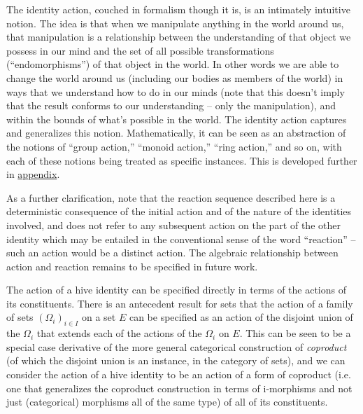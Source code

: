 \documentclass[pra,twocolumn,groupedaddress,10pt]{revtex4}
\theoremstyle{definition}
\begin{document}
The identity action, couched in formalism though it is, is an intimately intuitive notion. The idea is that when we manipulate anything in the world around us, that manipulation is a relationship between the understanding of that object we possess in our mind and the set of all possible transformations (``endomorphisms'') of that object in the world. In other words we are able to change the world around us (including our bodies as members of the world) in ways that we understand how to do in our minds (note that this doesn't imply that the result conforms to our understanding -- only the manipulation), and within the bounds of what's possible in the world. The identity action captures and generalizes this notion. Mathematically, it can be seen as an abstraction of the notions of ``group action,'' ``monoid action,'' ``ring action,'' and so on, with each of these notions being treated as specific instances. This is developed further in \hyperref[app:algact]{appendix}.

As a further clarification, note that the reaction sequence described here is a deterministic consequence of the initial action and of the nature of the identities involved, and does not refer to any subsequent action on the part of the other identity which may be entailed in the conventional sense of the word ``reaction'' -- such an action would be a distinct action. The algebraic relationship between action and reaction remains to be specified in future work.

The action of a hive identity can be specified directly in terms of the actions of its constituents. There is an antecedent result for sets that the action of a family of sets $(\Omega_i)_{i \in I}$ on a set $E$ can be specified as an action of the disjoint union of the $\Omega_i$ that extends each of the actions of the $\Omega_i$ on $E$\cite{bourbaki}. This can be seen to be a special case derivative of the more general categorical construction of \emph{coproduct} (of which the disjoint union is an instance, in the category of sets), and we can consider the action of a hive identity to be an action of a form of coproduct (i.e. one that generalizes the coproduct construction in terms of i-morphisms and not just (categorical) morphisms all of the same type) of all of its constituents.
\end{document}
